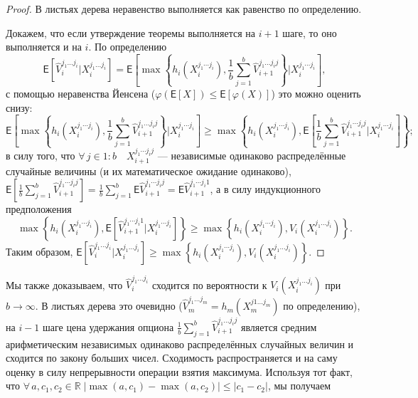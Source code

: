 \documentclass[specialist,
               substylefile = spbu.rtx,
               subf,href,colorlinks=true, 12pt]{disser}
\newcommand{\ev}{\mathsf{E}}
\begin{document}
		\begin{proof}
			\par В листьях дерева неравенство выполняется как равенство по определению.
			\par Докажем, что если утверждение теоремы выполняется на $i+1$ шаге, то оно выполняется и на $i$. По определению
			\begin{equation*}
			\ev\left[\hat{V}_i^{j_1\ldots j_i}|X_i^{j_1\ldots j_i}\right] = \ev\left[ \max\left\lbrace h_i\left(X_i^{j_1\cdots j_i}\right), \frac{1}{b}\sum_{j = 1}^b \hat{V}_{i+1}^{j_1 \ldots j_i j}\right\rbrace | X_i^{j_1\cdots j_i} \right],
			\end{equation*}
			с помощью неравенства Йенсена ($\varphi\left(\ev\left[X\right]\right) \leqslant \ev\left[\varphi(X)\right]$) это можно оценить снизу:
			\begin{equation*}
			\ev\left[ \max\left\lbrace h_i\left(X_i^{j_1\cdots j_i}\right), \frac{1}{b}\sum_{j = 1}^b \hat{V}_{i+1}^{j_1 \ldots j_i j}\right\rbrace | X_i^{j_1\cdots j_i} \right] \geqslant \max\left\lbrace h_i\left(X_i^{j_1\cdots j_i}\right), \ev\left[ \frac{1}{b}\sum_{j = 1}^b \hat{V}_{i+1}^{j_1 \cdots j_i j} | X_i^{j_1\cdots j_i} \right] \right\rbrace ;
			\end{equation*}
			в силу того, что $\forall \, j \in 1:b \quad X_{i+1}^{j_1\cdots j_i j}$ --- независимые одинаково распределённые случайные величины (и их математическое ожидание одинаково), $\ev\left[ \frac{1}{b}\sum_{j = 1}^b \hat{V}_{i+1}^{j_1 \cdots j_i j} \right] = \frac{1}{b}\sum_{j = 1}^b \ev\hat{V}_{i+1}^{j_1 \cdots j_i j} = \ev\hat{V}_{i+1}^{j_1 \cdots j_i 1}$, а в силу индукционного предположения
			\begin{equation*}
			\max\left\lbrace h_i\left(X_i^{j_1\cdots j_i}\right), \ev\left[ \hat{V}_{i+1}^{j_1 \cdots j_i 1} | X_i^{j_1\cdots j_i} \right] \right\rbrace \geqslant \max \left\lbrace h_i\left(X_i^{j_1\cdots j_i}\right), V_i\left(X_i^{j_1\ldots j_i}\right) \right\rbrace .
			\end{equation*}
			Таким образом, $\ev\left[\hat{V}_i^{j_1\ldots j_i}|X_i^{j_1\ldots j_i}\right] \geqslant \max \left\lbrace h_i\left(X_i^{j_1\cdots j_i}\right), V_i\left(X_i^{j_1\ldots j_i}\right) \right\rbrace$.
		\end{proof}
		\par Мы также доказываем, что $\hat{V}_i^{j_1\ldots j_i}$ сходится по вероятности к $V_i\left(X_i^{j_1\ldots j_i}\right)$ при $b \to \infty$. В листьях дерева это очевидно ($\hat{V}_m^{j_1 \ldots j_m} = h_m\left(X_m^{j1 \ldots j_m}\right)$ по определению), на $i-1$ шаге цена удержания опциона $\frac{1}{b} \sum_{j = 1}^b \hat{V}_{i+1}^{j_1 \ldots j_i j}$ является средним арифметическим независимых одинаково распределённых случайных величин и сходится по закону больших чисел. Сходимость распространяется и на саму оценку в силу непрерывности операции взятия максимума. Используя тот факт, что $\forall \, a, c_1, c_2 \in \mathbb{R} \; |\max\left(a, c_1\right) - \max\left(a, c_2\right)| \leqslant |c_1 - c_2|$, мы получаем
\end{document}
